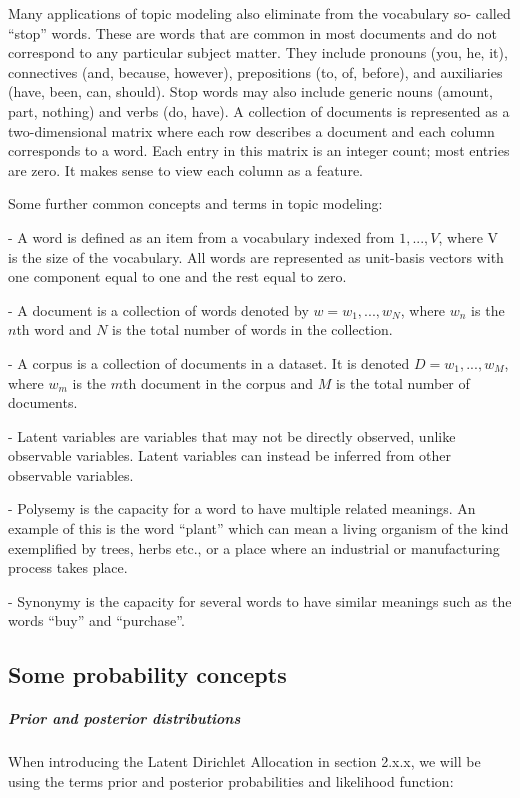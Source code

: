 \documentclass[12pt]{report}
\begin{document}
Many applications of topic modeling also eliminate from the vocabulary so-
called “stop” words. These are words that are common in most documents and do
not correspond to any particular subject matter. They include pronouns (you,
he, it), connectives (and, because, however), prepositions (to, of, before),
and auxiliaries (have, been, can, should). Stop words may also include generic
nouns (amount, part, nothing) and verbs (do, have). A collection of documents
is represented as a two-dimensional matrix where each row describes a document
and each column corresponds to a word. Each entry in this matrix is an integer
count; most entries are zero. It makes sense to view each column as a feature.

Some further common concepts and terms in topic modeling:

- A word is defined as an item from a vocabulary indexed from ${1, ..., V}$,
where V is the size of the vocabulary. All words are represented as unit-basis
vectors with one component equal to one and the rest equal to zero.

- A document is a collection of words denoted by $w = {w_1, ..., w_N}$, where
$w_n$ is the $n$th word and $N$ is the total number of words in the collection.

- A corpus is a collection of documents in a dataset. It is denoted $D = {w_1,
..., w_M}$, where $w_m$ is the $m$th document in the corpus and $M$ is the
total number of documents.

- Latent variables are variables that may not be directly observed, unlike
observable variables. Latent variables can instead be inferred from other
observable variables.

- Polysemy is the capacity for a word to have multiple related meanings. An
example of this is the word “plant” which can mean a living organism of the
kind exemplified by trees, herbs etc., or a place where an industrial or
manufacturing process takes place.

- Synonymy is the capacity for several words to have similar meanings such as
the words “buy” and “purchase”.

\subsection{Some probability concepts}

\subparagraph{Prior and posterior distributions}

When introducing the Latent Dirichlet Allocation in section 2.x.x, we will be
using the terms prior and posterior probabilities and likelihood function:
\end{document}
